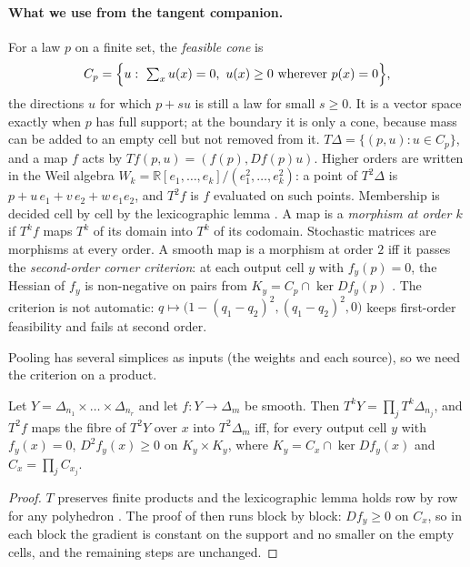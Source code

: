 \documentclass[11pt]{article}
\theoremstyle{definition}\newtheorem{definition}[theorem]{Definition}\newtheorem{remark}[theorem]{Remark}\newtheorem{example}[theorem]{Example}
\newcommand{\R}{\mathbb R}\newcommand{\D}{\mathcal D}
\begin{document}
\paragraph{What we use from the tangent companion.} For a law $p$ on a finite set, the \emph{feasible cone} is
\[
C_p=\Bigl\{u:\ \textstyle\sum_xu(x)=0,\ u(x)\ge0\text{ wherever }p(x)=0\Bigr\},
\]
the directions $u$ for which $p+su$ is still a law for small $s\ge0$. It is a vector space exactly when $p$ has full support; at the
boundary it is only a cone, because mass can be added to an empty cell but not removed from it. $T\Delta=\{(p,u):u\in C_p\}$, and a map
$f$ acts by $Tf(p,u)=(f(p),Df(p)u)$. Higher orders are written in the Weil algebra $W_k=\R[e_1,\dots,e_k]/(e_1^2,\dots,e_k^2)$: a point of
$T^2\Delta$ is $p+u\,e_1+v\,e_2+w\,e_1e_2$, and $T^2f$ is $f$ evaluated on such points. Membership is decided cell by cell by the
lexicographic lemma \cite[Lemma ``the lexicographic lemma'']{TangentCompanion}. A map is a \emph{morphism at order $k$} if $T^kf$ maps
$T^k$ of its domain into $T^k$ of its codomain. Stochastic matrices are morphisms at every order. A smooth map is a morphism at order $2$
iff it passes the \emph{second-order corner criterion}: at each output cell $y$ with $f_y(p)=0$, the Hessian of $f_y$ is non-negative on
pairs from $K_y=C_p\cap\ker Df_y(p)$ \cite[Theorem ``second-order cone morphisms'']{TangentCompanion}. The criterion is not automatic:
$q\mapsto\bigl(1-(q_1-q_2)^2,(q_1-q_2)^2,0\bigr)$ keeps first-order feasibility and fails at second order.

Pooling has several simplices as inputs (the weights and each source), so we need the criterion on a product.

\begin{lemma}\label{lem:products}
Let $Y=\Delta_{n_1}\times\dots\times\Delta_{n_r}$ and let $f:Y\to\Delta_m$ be smooth. Then $T^kY=\prod_jT^k\Delta_{n_j}$, and $T^2f$ maps the fibre
of $T^2Y$ over $x$ into $T^2\Delta_m$ iff, for every output cell $y$ with $f_y(x)=0$, $D^2f_y(x)\ge0$ on $K_y\times K_y$, where $K_y=C_x\cap\ker
Df_y(x)$ and $C_x=\prod_jC_{x_j}$.
\end{lemma}

\begin{proof}
$T$ preserves finite products and the lexicographic lemma holds row by row for any polyhedron \cite[Lemma ``the lexicographic
lemma'']{TangentCompanion}. The proof of \cite[Theorem ``second-order cone morphisms'']{TangentCompanion} then runs block by block: $Df_y\ge0$
on $C_x$, so in each block the gradient is constant on the support and no smaller on the empty cells, and the remaining steps are
unchanged.
\end{proof}
\end{document}
